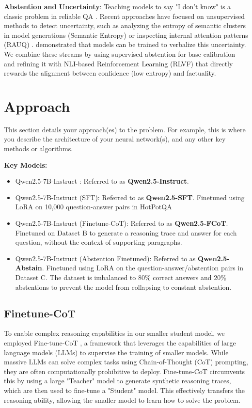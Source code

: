 \documentclass{article}
\begin{document}
\textbf{Abstention and Uncertainty}: Teaching models to say "I don't know" is a classic problem in reliable QA \cite{rajpurkar2018know}. Recent approaches have focused on unsupervised methods to detect uncertainty, such as analyzing the entropy of semantic clusters in model generations (Semantic Entropy) \cite{Farquhar2024Detecting} or inspecting internal attention patterns (RAUQ) \cite{vazhentsev2025rauq}. \cite{lin2022teaching} demonstrated that models can be trained to verbalize this uncertainty. We combine these streams by using supervised abstention for base calibration and refining it with NLI-based Reinforcement Learning (RLVF) that directly rewards the alignment between confidence (low entropy) and factuality.

\section{Approach}
This section details your approach(es) to the problem. 
For example, this is where you describe the architecture of your neural network(s), and any other key methods or algorithms.

\textbf{Key Models:}
\begin{itemize}
\item Qwen2.5-7B-Instruct \cite{qwen2025qwen25technicalreport}: Referred to as\textbf{ Qwen2.5-Instruct}.
\item Qwen2.5-7B-Instruct (SFT): Referred to as \textbf{Qwen2.5-SFT}. Finetuned using LoRA on 10,000 question-answer pairs in HotPotQA 
\item Qwen2.5-7B-Instruct (Finetune-CoT): Referred to as \textbf{Qwen2.5-FCoT}. Finetuned on Dataset B to generate a reasoning trace and answer for each question, without the context of supporting paragraphs. 
\item Qwen2.5-7B-Instruct (Abstention Finetuned): Referred to as \textbf{Qwen2.5-Abstain}. Finetuned using LoRA on the question-answer/abstention pairs in Dataset C. The dataset is imbalanced to 80\% correct answers and 20\% abstentions to prevent the model from collapsing to constant abstention.
\end{itemize}

\subsection{Finetune-CoT} \label{sec:finetune-cot}
To enable complex reasoning capabilities in our smaller student model, we employed Fine-tune-CoT \cite{ho2023largelanguagemodelsreasoning}, a framework that leverages the capabilities of large language models (LLMs) to supervise the training of smaller models. While massive LLMs can solve complex tasks using Chain-of-Thought (CoT) prompting, they are often computationally prohibitive to deploy. Fine-tune-CoT circumvents this by using a large "Teacher" model to generate synthetic reasoning traces, which are then used to fine-tune a "Student" model. This effectively transfers the reasoning ability, allowing the smaller model to learn how to solve the problem.
\end{document}
